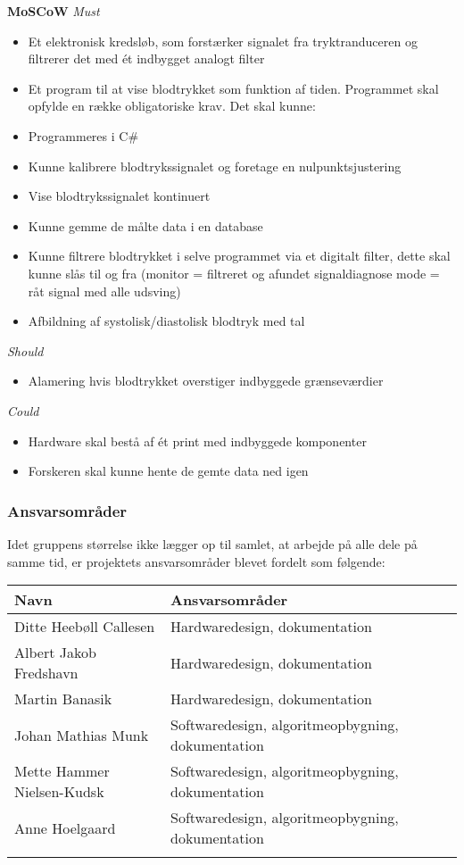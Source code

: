 \textbf{MoSCoW}
\textit{Must}
\begin{itemize}
\item Et elektronisk kredsløb, som forstærker signalet fra tryktranduceren og filtrerer det med ét indbygget analogt filter
\item Et program til at vise blodtrykket som funktion af tiden. Programmet skal opfylde en række obligatoriske krav. Det skal kunne:
\end{itemize}
\begin{itemize}
\item Programmeres i C\#
\item Kunne kalibrere blodtrykssignalet og foretage en nulpunktsjustering
\item Vise blodtrykssignalet kontinuert
\item Kunne gemme de målte data i en database
\item Kunne filtrere blodtrykket i selve programmet via et digitalt filter, dette skal kunne slås til og fra (monitor = filtreret og afundet signaldiagnose mode = råt signal med alle udsving)
\item Afbildning af systolisk/diastolisk blodtryk med tal
\end{itemize}
\textit{Should}
\begin{itemize}
\item Alamering hvis blodtrykket overstiger indbyggede grænseværdier
\end{itemize}
\textit{Could}
\begin{itemize}
\item Hardware skal bestå af ét print med indbyggede komponenter
\item Forskeren skal kunne hente de gemte data ned igen
\end{itemize}
 

\subsubsection{Ansvarsområder}

Idet gruppens størrelse ikke lægger op til samlet, at arbejde på alle dele på samme tid, er projektets ansvarsområder blevet fordelt som følgende:

\begin{longtabu} to 
    Navn &    Ansvarsområder &    \\[-1ex]
    \midrule
    Ditte Heebøll Callesen &   Hardwaredesign, dokumentation	&    \\
    Albert Jakob Fredshavn &   Hardwaredesign, dokumentation	&    \\
    Martin Banasik         &   Hardwaredesign, dokumentation	&    \\
    Johan Mathias Munk     &   Softwaredesign, algoritmeopbygning, dokumentation &    \\
    Mette Hammer Nielsen-Kudsk &   Softwaredesign, algoritmeopbygning, dokumentation &    \\
   	Anne Hoelgaard    &   Softwaredesign, algoritmeopbygning, dokumentation	&    \\
\label{version_Systemark}
\end{longtabu}